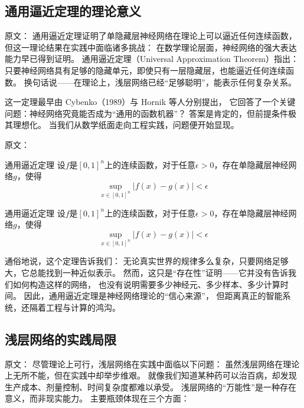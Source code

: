 \subsection{通用逼近定理的理论意义}

原文：
通用逼近定理证明了单隐藏层神经网络在理论上可以逼近任何连续函数，但这一理论结果在实践中面临诸多挑战：
在数学理论层面，神经网络的强大表达能力早已得到证明。  
通用逼近定理（Universal Approximation Theorem）指出：  
只要神经网络具有足够的隐藏单元，即使只有一层隐藏层，也能逼近任何连续函数。  
换句话说——在理论上，浅层网络已经“足够聪明”，能表示任何复杂关系。  

这一定理最早由 Cybenko（1989）与 Hornik 等人分别提出，  
它回答了一个关键问题：神经网络究竟能否成为“通用的函数机器”？  
答案是肯定的，但前提条件极其理想化。  
当我们从数学纸面走向工程实践，问题便开始显现。

原文：
\begin{theorem}[]{通用逼近定理}
设$f$是$[0,1]^n$上的连续函数，对于任意$\epsilon > 0$，存在单隐藏层神经网络$g$，使得
$$\sup_{x \in [0,1]^n} |f(x) - g(x)| < \epsilon$$
\end{theorem}
\begin{theorem}[]{通用逼近定理}
设$f$是$[0,1]^n$上的连续函数，对于任意$\epsilon > 0$，存在单隐藏层神经网络$g$，使得
$$\sup_{x \in [0,1]^n} |f(x) - g(x)| < \epsilon$$
\end{theorem}

通俗地说，这个定理告诉我们：  
无论真实世界的规律多么复杂，只要网络足够大，它总能找到一种近似表示。  
然而，这只是“存在性”证明——它并没有告诉我们如何构造这样的网络，  
也没有说明需要多少神经元、多少样本、多少计算时间。  
因此，通用逼近定理是神经网络理论的“信心来源”，  
但距离真正的智能系统，还隔着工程与计算的鸿沟。


\subsection{浅层网络的实践局限}

原文：
尽管理论上可行，浅层网络在实践中面临以下问题：
虽然浅层网络在理论上无所不能，但在实践中却举步维艰。  
就像我们知道某种药可以治百病，却发现生产成本、剂量控制、时间复杂度都难以承受。  
浅层网络的“万能性”是一种存在意义，而非现实能力。  
主要瓶颈体现在三个方面：

